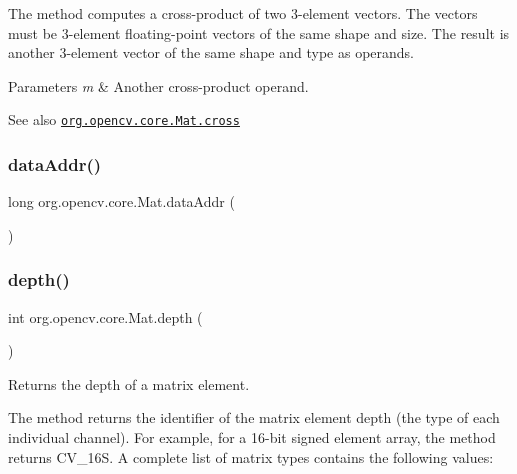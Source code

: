 The method computes a cross-\/product of two 3-\/element vectors. The vectors must be 3-\/element floating-\/point vectors of the same shape and size. The result is another 3-\/element vector of the same shape and type as operands.


\begin{DoxyParams}{Parameters}
{\em m} & Another cross-\/product operand.\\
\hline
\end{DoxyParams}
\begin{DoxySeeAlso}{See also}
\href{http://docs.opencv.org/modules/core/doc/basic_structures.html#mat-cross}{\tt org.\+opencv.\+core.\+Mat.\+cross} 
\end{DoxySeeAlso}
\mbox{\label{classorg_1_1opencv_1_1core_1_1_mat_a3b5dcff6ae75137a18cd781454b1129a}} 
\subsubsection{\texorpdfstring{data\+Addr()}{dataAddr()}}
{\footnotesize\ttfamily long org.\+opencv.\+core.\+Mat.\+data\+Addr (\begin{DoxyParamCaption}{ }\end{DoxyParamCaption})}

\mbox{\label{classorg_1_1opencv_1_1core_1_1_mat_a9bf4679d10841047167676cde239a5b9}} 
\subsubsection{\texorpdfstring{depth()}{depth()}}
{\footnotesize\ttfamily int org.\+opencv.\+core.\+Mat.\+depth (\begin{DoxyParamCaption}{ }\end{DoxyParamCaption})}

Returns the depth of a matrix element.

The method returns the identifier of the matrix element depth (the type of each individual channel). For example, for a 16-\/bit signed element array, the method returns {\ttfamily C\+V\+\_\+16S}. A complete list of matrix types contains the following values\+:



